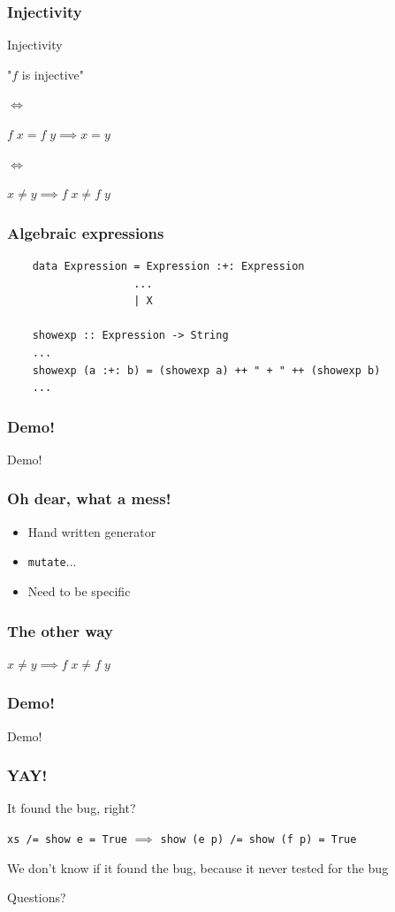 \documentclass{beamer}
\begin{document}
\begin{frame}
    \frametitle{Injectivity}
        \begin{block}{Injectivity}
            \centerline{"$f$ is injective"}
            \centerline{$\iff$}
            \centerline{$f\;x=f\;y\implies x = y$}
            \centerline{$\iff$}
            \centerline{$x \neq y \implies f\;x\neq f\;y$}
        \end{block}
\end{frame}

\begin{frame}[fragile]
    \frametitle{Algebraic expressions}
    \begin{verbatim}
    data Expression = Expression :+: Expression
                    ...
                    | X

    showexp :: Expression -> String
    ...
    showexp (a :+: b) = (showexp a) ++ " + " ++ (showexp b)
    ...
    \end{verbatim}
\end{frame}

\begin{frame}
    \frametitle{Demo!}
    \Huge{\centerline{Demo!}}
\end{frame}

\begin{frame}
    \frametitle{Oh dear, what a mess!}
    \begin{itemize}
        \item Hand written generator
        \item \texttt{mutate}...
        \item Need to be specific
    \end{itemize}
\end{frame}

\begin{frame}
    \frametitle{The other way}
    \centerline{$x \neq y \implies f\;x\neq f\;y$} 
\end{frame}

\begin{frame}
    \frametitle{Demo!}
    \Huge{\centerline{Demo!}}
\end{frame}

\begin{frame}
    \frametitle{YAY!}
    \centerline{It found the bug, right?}
    \pause
    \centerline{}
    \centerline{\texttt{xs /= show e = True} $\implies$ \texttt{show (e p) /= show (f p) = True}}
    \centerline{}
    \centerline{We don't know if it found the bug, because it never tested for the bug}
\end{frame}

\begin{frame}
    \Huge{\centerline{Questions?}}
\end{frame}
\end{document}
